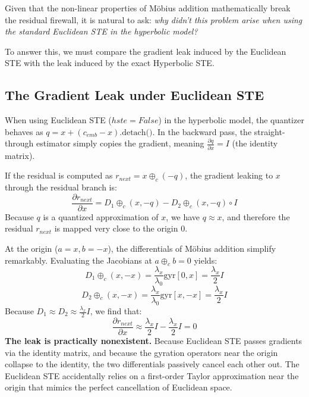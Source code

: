 \documentclass{article}
\begin{document}
Given that the non-linear properties of Möbius addition mathematically break the residual firewall, it is natural to ask: \textit{why didn't this problem arise when using the standard Euclidean STE in the hyperbolic model?}

To answer this, we must compare the gradient leak induced by the Euclidean STE with the leak induced by the exact Hyperbolic STE.

\subsection*{The Gradient Leak under Euclidean STE}
When using Euclidean STE ($hste=False$) in the hyperbolic model, the quantizer behaves as $q = x + (c_{emb} - x)\text{.detach()}$. In the backward pass, the straight-through estimator simply copies the gradient, meaning $\frac{\partial q}{\partial x} = I$ (the identity matrix).

If the residual is computed as $r_{next} = x \oplus_c (-q)$, the gradient leaking to $x$ through the residual branch is:
\begin{equation}
    \frac{\partial r_{next}}{\partial x} = D_1 \oplus_c(x, -q) - D_2 \oplus_c(x, -q) \circ I
\end{equation}
Because $q$ is a quantized approximation of $x$, we have $q \approx x$, and therefore the residual $r_{next}$ is mapped very close to the origin $0$. 

At the origin ($a = x, b = -x$), the differentials of Möbius addition simplify remarkably. Evaluating the Jacobians at $a \oplus_c b = 0$ yields:
\begin{equation}
    D_1 \oplus_c(x, -x) = \frac{\lambda_x}{\lambda_0} \text{gyr}[0, x] = \frac{\lambda_x}{2} I
\end{equation}
\begin{equation}
    D_2 \oplus_c(x, -x) = \frac{\lambda_x}{\lambda_0} \text{gyr}[x, -x] = \frac{\lambda_x}{2} I
\end{equation}
Because $D_1 \approx D_2 \approx \frac{\lambda_x}{2} I$, we find that:
\begin{equation}
    \frac{\partial r_{next}}{\partial x} \approx \frac{\lambda_x}{2} I - \frac{\lambda_x}{2} I = 0
\end{equation}
\textbf{The leak is practically nonexistent.} Because Euclidean STE passes gradients via the identity matrix, and because the gyration operators near the origin collapse to the identity, the two differentials passively cancel each other out. The Euclidean STE accidentally relies on a first-order Taylor approximation near the origin that mimics the perfect cancellation of Euclidean space.
\end{document}
